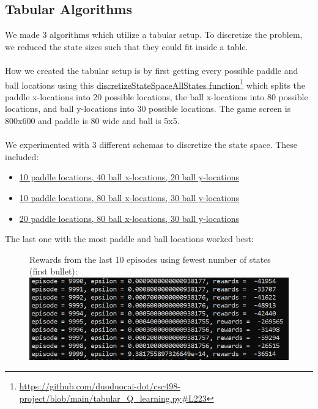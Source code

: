 \documentclass[twoside,11pt]{article}
\newcommand\fnurl[2]{%
  \href{#2}{#1}\footnote{\url{#2}}%
}
\begin{document}
\subsection{Tabular Algorithms}
We made 3 algorithms which utilize a tabular setup. To discretize the problem, we reduced the state sizes such that they could fit inside a table.
\\\\
How we created the tabular setup is by first getting every possible paddle and ball locations
using this \fnurl{discretizeStateSpaceAllStates function}{https://github.com/duoduocai-dot/csc498-project/blob/main/tabular_Q_learning.py\#L223} which splits the paddle x-locations into 20 possible locations, the ball x-locations into 80 possible locations, and ball y-locations into 30 possible locations. The game screen is 800x600 and paddle is 80 wide and ball is 5x5.
\\\\
We experimented with 3 different schemas to discretize the state space. These included:
\begin{itemize}
\item \href{https://github.com/duoduocai-dot/csc498-project/blob/main/tabular_Q_learning.py#L180}{10 paddle locations, 40 ball x-locations, 20 ball y-locations}
\item \href{https://github.com/duoduocai-dot/csc498-project/blob/main/tabular_Q_learning.py#L203}{10 paddle locations, 80 ball x-locations, 30 ball y-locations}
\item \href{https://github.com/duoduocai-dot/csc498-project/blob/main/tabular_Q_learning.py#L223}{20 paddle locations, 80 ball x-locations, 30 ball y-locations}
\end{itemize}
The last one with the most paddle and ball locations worked best:
\begin{figure}[H]
Rewards from the last 10 episodes using fewest number of states (first bullet):\\
\includegraphics[scale=0.5]{rewards_last_10_episodes_fewest_number_states}
\centering
\end{figure}
\end{document}
